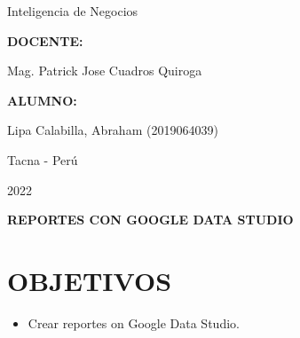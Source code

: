 \documentclass[12pt,letterpaper]{article}
\begin{document}
\begin{titlepage}
\begin{center}
\begin{large}
                Inteligencia de Negocios\\
            \end{large}
            \vspace*{0.2in}
            \begin{Large}
                \textbf{DOCENTE:} \\
            \end{Large}
            \vspace*{0.1in}
            \begin{large}
                Mag. Patrick Jose Cuadros Quiroga\\
            \end{large}
            \vspace*{0.3in}
            \begin{large}
                \textbf{ALUMNO:} \\
                \begin{flushleft}
                    Lipa Calabilla, Abraham  		\hfill	(2019064039) \\
                \end{flushleft}
            \end{large}
            \vspace*{1.3in}
            \begin{large}
                Tacna - Perú\\
            \end{large}
            \vspace*{0.1in}
            \begin{large}
                2022\\
            \end{large}
        \end{center}
    \end{titlepage}
    
    \newpage
    \tableofcontents
    \justify
    \newpage
    \begin{LARGE}
        \begin{center}
            \textbf{REPORTES CON GOOGLE DATA STUDIO} \\
        \end{center}
    \end{LARGE}
    \section{OBJETIVOS}
    \begin{itemize}
        \item Crear reportes on Google Data Studio.
    \end{itemize}
\end{document}
